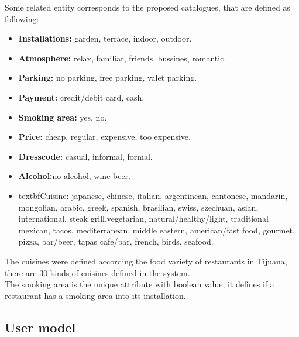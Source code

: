 Some related entity corresponds to the proposed catalogues, 
that are defined as following: 
\begin{itemize}
\item  \textbf{Installations:} garden, terrace, indoor, outdoor.
\item  \textbf{Atmosphere:} relax, familiar, friends, bussines, romantic.
\item  \textbf{Parking:} no parking, free parking, valet parking.
\item  \textbf{Payment:} credit/debit card, cash.
\item  \textbf{Smoking area:} yes, no.
\item  \textbf{Price:} cheap, regular, expensive, too expensive.
\item  \textbf{Dresscode:} casual, informal, formal.
\item  \textbf{Alcohol:}no alcohol, wine-beer.
\item  textbf{Cuisine:} japanese, chinese, italian, argentinean,
cantonese, mandarin, mongolian, arabic, greek, spanish, brasilian,
swiss, szechuan, asian, international, steak grill,vegetarian,
natural/healthy/light, traditional mexican, tacos, mediterranean,
middle eastern, american/fast food, gourmet, pizza, bar/beer, tapas
cafe/bar, french, birds, seafood.

\end{itemize}

The cuisines were defined according the food variety of restaurants in
Tijuana, there are 30 kinds of cuisines defined in the system. \\
The smoking area is the unique attribute with boolean value, it
defines if a restaurant has a smoking area into its installation.

\subsection{User model} 

